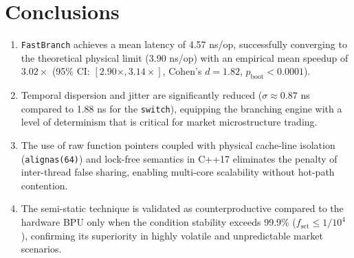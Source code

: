 \section{Conclusions}

\begin{enumerate}
    \item \texttt{FastBranch} achieves a mean latency of 4.57 ns/op, successfully converging to the theoretical physical limit (3.90 ns/op) with an empirical mean speedup of $3.02\times$ (95\% CI: $[2.90\times, 3.14\times]$, Cohen's $d = 1.82$, $p_{\text{boot}} < 0.0001$).
    \item Temporal dispersion and jitter are significantly reduced ($\sigma \approx 0.87$ ns compared to 1.88 ns for the \texttt{switch}), equipping the branching engine with a level of determinism that is critical for market microstructure trading.
    \item The use of raw function pointers coupled with physical cache-line isolation (\texttt{alignas(64)}) and lock-free semantics in C++17 eliminates the penalty of inter-thread false sharing, enabling multi-core scalability without hot-path contention.
    \item The semi-static technique is validated as counterproductive compared to the hardware BPU only when the condition stability exceeds 99.9\% ($f_{\text{set}} \le 1/10^4$), confirming its superiority in highly volatile and unpredictable market scenarios.
\end{enumerate}
